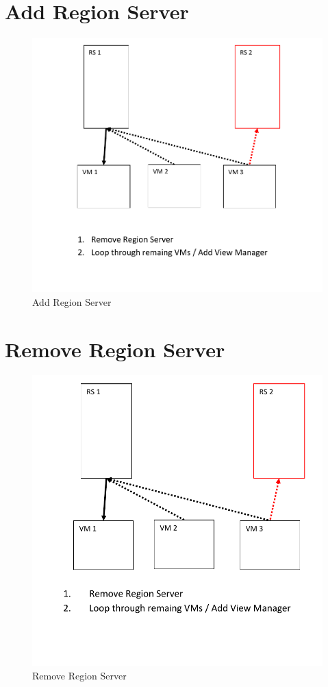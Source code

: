 \section{Add Region Server}
\begin{figure}[h!]
  \centering
    \includegraphics[scale=0.8]{figures/LB_AddRegionServer}
     \caption{Add Region Server}
    \label{fig:lb_addregionserver}
\end{figure}
\newpage

\section{Remove Region Server}
\begin{figure}[h!]
  \centering
    \includegraphics[scale=0.8]{figures/LB_RemoveRegionServer}
    \caption{Remove Region Server}
    \label{fig:lb_removeregionserver}
\end{figure}
\newpage


